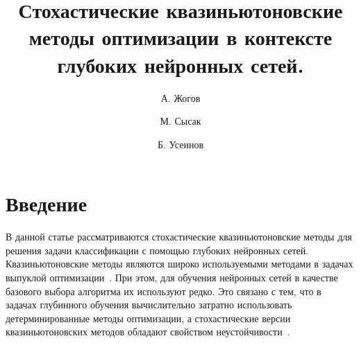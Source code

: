 \documentclass[preprint,12pt]{elsarticle}
\renewenvironment{abstract}{\global\setbox\absbox=\vbox\bgroup
  \hsize=\textwidth\def\baselinestretch{1}%
  \noindent\unskip\textbf{Abstract}
 \par\medskip\noindent\unskip\ignorespaces}
 {\egroup}
\begin{document}
\begin{frontmatter}


\title{Стохастические квазиньютоновские методы оптимизации в контексте глубоких нейронных сетей.}




\author[mipt]{А. Жогов}
\author[mipt]{М. Сысак}
\author[mipt]{Б. Усеинов}

\address[mipt]{Московский физико-технический институт (национальный исследовательский университет), Москва, Россия}



\begin{keyword}


\end{keyword}

\end{frontmatter}


\section{Введение}
\label{S:0}
В данной статье рассматриваются стохастические  квазиньютоновские методы для решения задачи классификации с помощью глубоких нейронных сетей. Квазиньютоновские методы являются широко используемыми методами в задачах выпуклой оптимизации~\cite{BBorig,BFGSorig, numopt}. При этом, для обучения нейронных сетей в качестве базового выбора алгоритма их используют редко. Это связано с тем, что в задачах глубинного обучения вычислительно затратно использовать детерминированные методы оптимизации, а стохастические версии квазиньютоновских методов обладают свойством неустойчивости~\cite{LBFGSunstable,barzilaiborwein}.
\end{document}
